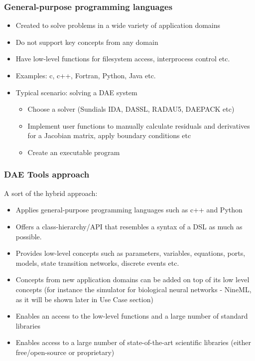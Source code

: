 \documentclass{beamer}
\begin{document}
\begin{frame}
\frametitle{General-purpose programming languages}
\begin{block}{}
\begin{itemize}
  \item Created to solve problems in a wide variety of application domains
  \item Do not support key concepts from any domain
  \item Have low-level functions for filesystem access, interprocess control etc.
  \item Examples: c, c++, Fortran, Python, Java etc.
  \item Typical scenario: solving a DAE system
  \begin{itemize}
    \item Choose a solver (Sundials IDA, DASSL, RADAU5, DAEPACK etc)
    \item Implement user functions to manually calculate residuals and derivatives for a Jacobian matrix, apply boundary conditions etc
    \item Create an executable program
  \end{itemize}
\end{itemize}
\end{block}
\end{frame}

\begin{frame}
\frametitle{DAE Tools approach}
\begin{block}{}
A sort of the hybrid approach:
\begin{itemize}
  \item Applies general-purpose programming languages such as c++ and Python
  \item Offers a class-hierarchy/API that resembles a syntax of a DSL as much as possible. 
  \item Provides low-level concepts such as parameters, variables, equations, ports, models, state transition networks, discrete events etc.
  \item Concepts from new application domains can be added on top of its low level concepts (for instance the simulator for biological neural networks - NineML, as it will be shown later in Use Case section)
  \item Enables an access to the low-level functions and a large number of standard libraries
  \item Enables access to a large number of state-of-the-art scientific libraries (either free/open-source or proprietary)
\end{itemize}
\end{block}
\end{frame}
\end{document}
